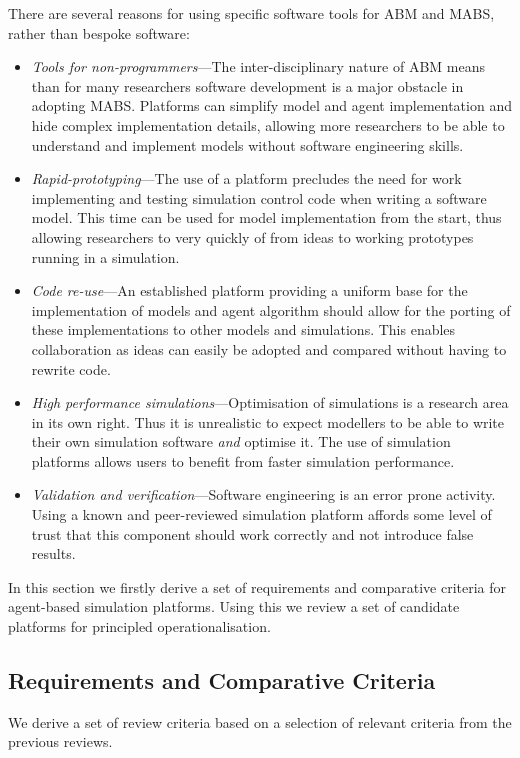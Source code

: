 There are several reasons for using specific software tools for \ac{ABM} and \ac{MABS}, rather than bespoke software:
\begin{itemize}
\item \emph{Tools for non-programmers}---The inter-disciplinary nature of \ac{ABM} means than for many researchers software development is a major obstacle in adopting \ac{MABS}. Platforms can simplify model and agent implementation and hide complex implementation details, allowing more researchers to be able to understand and implement models without software engineering skills.
\item \emph{Rapid-prototyping}---The use of a platform precludes the need for work implementing and testing simulation control code when writing a software model. This time can be used for model implementation from the start, thus allowing researchers to very quickly of from ideas to working prototypes running in a simulation.
\item \emph{Code re-use}---An established platform providing a uniform base for the implementation of models and agent algorithm should allow for the porting of these implementations to other models and simulations. This enables collaboration as ideas can easily be adopted and compared without having to rewrite code.
\item \emph{High performance simulations}---Optimisation of simulations is a research area in its own right. Thus it is unrealistic to expect modellers to be able to write their own simulation software \emph{and} optimise it. The use of simulation platforms allows users to benefit from faster simulation performance.
\item \emph{Validation and verification}---Software engineering is an error prone activity. Using a known and peer-reviewed simulation platform affords some level of trust that this component should work correctly and not introduce false results. 
\end{itemize}

In this section we firstly derive a set of requirements and comparative criteria for agent-based simulation platforms. Using this we review a set of candidate platforms for principled operationalisation. 

\subsection{Requirements and Comparative Criteria}\label{sec:p2:reviewcritera}

We derive a set of review criteria based on a selection of relevant criteria from the previous reviews.

